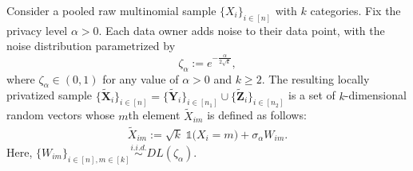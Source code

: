 \documentclass[twoside,11pt]{article}
\newcommand{\rvOne}{X}
\newcommand{\vectorize}[1]{\mathbf{#1}}
\newcommand{\rvX}{X} %
\newcommand{\rVecX}{\vectorize{\rvX}}
\newcommand{\rvY}{Y}
\newcommand{\rVecY}{\vectorize{\rvY}}
\newcommand{\rvZ}{Z}
\newcommand{\rVecZ}{\vectorize{\rvZ}}
\newcommand{\sampleIndexOne}{i}
\newcommand{\alphabetSize}{k} %
\newcommand{\vectorIndex}{m}
\newcommand{\privacyParameter}{\alpha} %
\newcommand{\distparamDiscLap}{\zeta}%
\newcommand{\LapUParam}{\sigma_{\privacyParameter}}
\newcommand{\discLapUParam}{\distparamDiscLap_{\privacyParameter}}
\begin{document}
\begin{itemize}
\begin{definition}\label{def:DiscLapU_formal}
	Consider a pooled raw multinomial sample $\{X_i\}_{i \in [n]}$ with $\alphabetSize$ categories. Fix the privacy level $\privacyParameter>0$. Each data owner adds noise to their data point, with the noise distribution parametrized by
	$$\discLapUParam := e^{
		-
		\frac{\privacyParameter}{2\sqrt{\alphabetSize}}
	},$$
	where $\discLapUParam \in (0,1)$  for any value of $\privacyParameter>0$ and $\alphabetSize \geq 2$. The resulting locally privatized sample $\{\tilde{\rVecX}_{i}\}_{i \in [n]} = \{\tilde{\rVecY}_i\}_{i\in [n_1]} \cup \{\tilde{\rVecZ}_i\}_{i \in [n_2]}$ is a set of 
	$\alphabetSize$-dimensional random vectors whose $\vectorIndex$th element $\tilde{\rvOne}_{im}$ is defined as follows:
	\begin{align*}
		\tilde{\rvOne}_{im}
		:=
		\sqrt{\alphabetSize} \;
		\mathds{1}
		\bigl(
		\rvX_{\sampleIndexOne} = \vectorIndex
		\bigr)
		+
		\LapUParam
		W_{i\vectorIndex}.
	\end{align*}
	Here, $\{W_{i \vectorIndex}\}_{i \in [n], m \in [k]} \stackrel{i.i.d.}{\sim} DL(\discLapUParam)$.
\end{definition}


\end{itemize}
\end{document}
